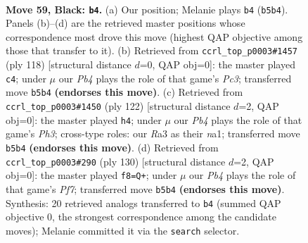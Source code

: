 \documentclass[11pt]{article}
\begin{document}
\clearpage

\begin{figure}[p]\centering
\begin{subfigure}{0.46\textwidth}\centering
\resizebox{\linewidth}{!}{%
\newchessgame
\chessboard[
  setfen={6K1/8/8/1p5k/8/r7/8/8 b - - 13 59},
  showmover=false,
  pgfstyle=straightmove, color=movearrow, markmove={b5-b4}
]}
\caption{}
\end{subfigure}\hfill
\begin{subfigure}{0.46\textwidth}\centering
\resizebox{\linewidth}{!}{%
\newchessgame
\chessboard[
  setfen={8/k7/8/5R2/8/2P5/6K1/8 w - - 1 60},
  showmover=false,
  pgfstyle=straightmove, color=movearrow, markmove={c3-c4}
]}
\caption{}
\end{subfigure}
\\[4pt]
\begin{subfigure}{0.46\textwidth}\centering
\resizebox{\linewidth}{!}{%
\newchessgame
\chessboard[
  setfen={8/1k6/8/6K1/8/7P/8/n7 w - - 3 62},
  showmover=false,
  pgfstyle=straightmove, color=movearrow, markmove={h3-h4}
]}
\caption{}
\end{subfigure}\hfill
\begin{subfigure}{0.46\textwidth}\centering
\resizebox{\linewidth}{!}{%
\newchessgame
\chessboard[
  setfen={8/5P2/8/4K3/8/k7/8/8 w - - 1 66},
  showmover=false,
  pgfstyle=straightmove, color=movearrow, markmove={f7-f8}
]}
\caption{}
\end{subfigure}
\caption{\textbf{Move 59, Black: \texttt{b4}.} (a) Our position; Melanie plays \texttt{b4} (\texttt{b5b4}). Panels (b)--(d) are the retrieved master positions whose correspondence most drove this move (highest QAP objective among those that transfer to it). (b) Retrieved from \texttt{ccrl\_top\_p0003\#1457} (ply 118) [structural distance $d$=0, QAP obj=0]: the master played \texttt{c4}; under $\mu$ our \emph{Pb4} plays the role of that game's \emph{Pc3}; transferred move \texttt{b5b4} \textbf{(endorses this move)}. (c) Retrieved from \texttt{ccrl\_top\_p0003\#1450} (ply 122) [structural distance $d$=2, QAP obj=0]: the master played \texttt{h4}; under $\mu$ our \emph{Pb4} plays the role of that game's \emph{Ph3}; cross-type roles: our \emph{R}a3 as their \emph{n}a1; transferred move \texttt{b5b4} \textbf{(endorses this move)}. (d) Retrieved from \texttt{ccrl\_top\_p0003\#290} (ply 130) [structural distance $d$=2, QAP obj=0]: the master played \texttt{f8=Q+}; under $\mu$ our \emph{Pb4} plays the role of that game's \emph{Pf7}; transferred move \texttt{b5b4} \textbf{(endorses this move)}. Synthesis: 20 retrieved analogs transferred to \texttt{b4} (summed QAP objective 0, the strongest correspondence among the candidate moves); Melanie committed it via the \texttt{search} selector.}
\label{fig:thought-m117}
\end{figure}
\end{document}

